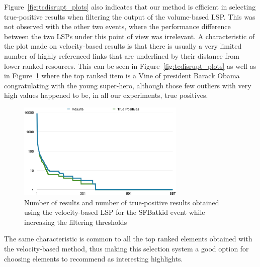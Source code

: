 \documentclass{sig-alternate}
\begin{document}
Figure~\ref{fig:tcdisrupt_plots} also indicates that our method is efficient in selecting true-positive results when filtering the output of the volume-based LSP. This was not observed with the other two events, where the performance difference between the two LSPs under this point of view was irrelevant. A characteristic of the plot made on velocity-based results is that there is usually a very limited number of highly referenced links that are underlined by their distance from lower-ranked resources. This can be seen in Figure~\ref{fig:tcdisrupt_plots} as well as in Figure~\ref{fig:sfbatkid_plot} where the top ranked item is a Vine of president Barack Obama congratulating with the young super-hero, although those few outliers with very high values happened to be, in all our experiments, true positives.
\begin{figure}[htbp]
  \centering
  \includegraphics[width=8cm]{Figures/batkid_plot.png}
  \caption{Number of results and number of true-positive results obtained using the velocity-based LSP for the SFBatkid event while increasing the filtering thresholds}
  \label{fig:sfbatkid_plot}
\end{figure}

The same characteristic is common to all the top ranked elements obtained with the velocity-based method, thus making this selection system a good option for choosing elements to recommend as interesting highlights.
\end{document}
